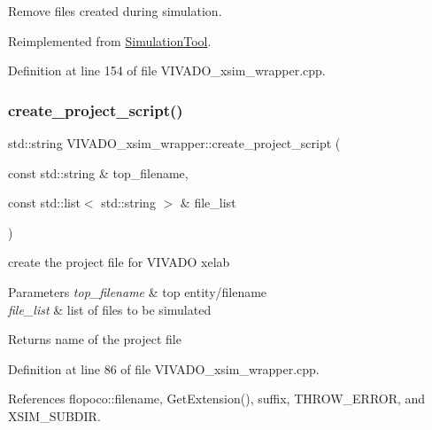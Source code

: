 Remove files created during simulation. 



Reimplemented from \hyperlink{classSimulationTool_a200fbae071dc751132117e922cf8ffc3}{Simulation\+Tool}.



Definition at line 154 of file V\+I\+V\+A\+D\+O\+\_\+xsim\+\_\+wrapper.\+cpp.

\mbox{\label{classVIVADO__xsim__wrapper_af41bba7dc3aace458c6626fbd0e1bc04}} 
\subsubsection{\texorpdfstring{create\+\_\+project\+\_\+script()}{create\_project\_script()}}
{\footnotesize\ttfamily std\+::string V\+I\+V\+A\+D\+O\+\_\+xsim\+\_\+wrapper\+::create\+\_\+project\+\_\+script (\begin{DoxyParamCaption}\item[{const std\+::string \&}]{top\+\_\+filename,  }\item[{const std\+::list$<$ std\+::string $>$ \&}]{file\+\_\+list }\end{DoxyParamCaption})\hspace{0.3cm}{\ttfamily [private]}}



create the project file for V\+I\+V\+A\+DO xelab 


\begin{DoxyParams}{Parameters}
{\em top\+\_\+filename} & top entity/filename \\
\hline
{\em file\+\_\+list} & list of files to be simulated \\
\hline
\end{DoxyParams}
\begin{DoxyReturn}{Returns}
name of the project file 
\end{DoxyReturn}


Definition at line 86 of file V\+I\+V\+A\+D\+O\+\_\+xsim\+\_\+wrapper.\+cpp.



References flopoco\+::filename, Get\+Extension(), suffix, T\+H\+R\+O\+W\+\_\+\+E\+R\+R\+OR, and X\+S\+I\+M\+\_\+\+S\+U\+B\+D\+IR.



